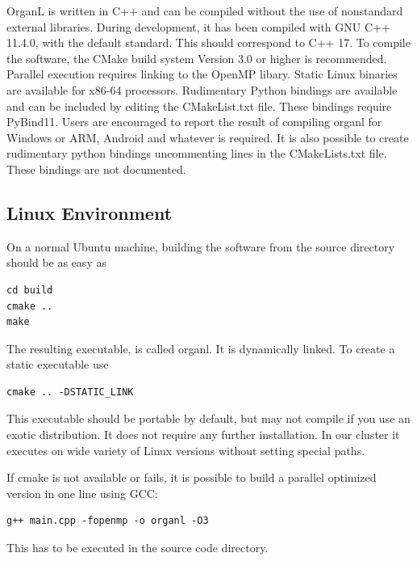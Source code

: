 \documentclass[11pt]{article}
\begin{document}
OrganL is written in C++ and can be compiled without the use of nonstandard external libraries. During development, it has been compiled with GNU C++ 11.4.0\cite{gcc}, with the default standard. This should correspond to C++ 17. 
To compile the software, the CMake build system Version 3.0\cite{cmake} or higher is recommended.
Parallel execution requires linking to the OpenMP libary\cite{openmp}. 
Static Linux binaries are available for x86-64 processors. 
Rudimentary Python bindings are available and can be included by editing the CMakeList.txt file. These bindings require PyBind11\cite{pybind11}. Users are encouraged to report the result of compiling organl for Windows or ARM, Android and whatever
is required. It is also possible to create rudimentary python bindings uncommenting lines in the CMakeLists.txt file. These bindings are not documented.

\subsection{Linux Environment}
On a normal Ubuntu machine, building the software from the source directory should be as easy as

\begin{mdframed}[backgroundcolor=lightgray, linecolor=lightgray]
\begin{verbatim}
cd build
cmake ..
make
\end{verbatim}
\end{mdframed}

The resulting executable, is called organl. It is dynamically linked. To create a static executable use 
\begin{mdframed}[backgroundcolor=lightgray, linecolor=lightgray]
\begin{verbatim}
cmake .. -DSTATIC_LINK
\end{verbatim}
\end{mdframed}
This executable should be portable by default, but may not compile if you use an exotic distribution. It does not require any further installation. In our cluster it executes on wide variety of Linux versions without setting special paths.

If cmake is not available or fails, it is possible to build a parallel optimized version in one line using GCC:
\begin{mdframed}[backgroundcolor=lightgray, linecolor=lightgray]
\begin{verbatim}
g++ main.cpp -fopenmp -o organl -O3
\end{verbatim}
\end{mdframed}
This has to be executed in the source code directory.
\end{document}
